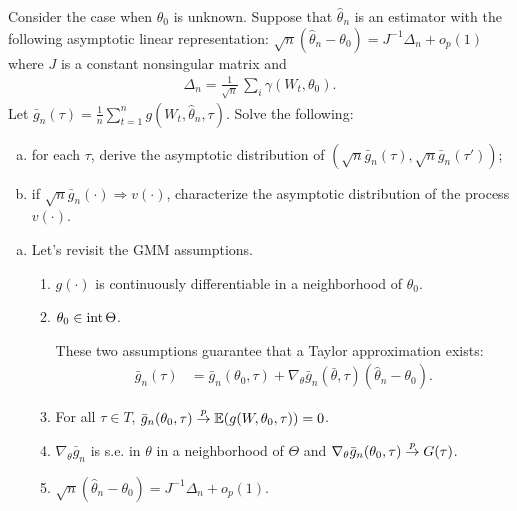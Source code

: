 \documentclass[11pt,letterpaper]{article}                  %
\begin{document}
\bigskip
\begin{problem}

\end{problem}

\bigskip
\begin{problem}
Consider the case when $\theta_0$ is unknown.
Suppose that $\hat{\theta}_n$ is an estimator with the following asymptotic linear representation:
$\sqrt{n} \left( \hat{\theta}_n - \theta_0 \right) = J^{-1} \Delta_n + o_p(1)$ where $J$ is a constant nonsingular matrix and
\begin{align*}
	\Delta_n = \frac{1}{\sqrt{n}} \, \sum_i \gamma (W_t, \theta_0).
\end{align*}
Let $\bar{g}_n (\tau) = \frac{1}{n} \sum_{t=1}^n g \left( W_t, \hat{\theta}_n, \tau \right)$.
Solve the following:
\begin{enumerate}[(a)]
	\item for each $\tau$, derive the asymptotic distribution of $(\sqrt{n} \bar{g}_n (\tau), \sqrt{n} \bar{g}_n (\tau'))$;
	\item if $\sqrt{n} \bar{g}_n (\cdot) \Rightarrow v(\cdot)$, characterize the asymptotic distribution of the process $v(\cdot)$.
\end{enumerate}

\medskip
\begin{enumerate}[(a)]
\item Let's revisit the GMM assumptions.

\begin{enumerate}[(1)]
	\item $g(\cdot)$ is continuously differentiable in a neighborhood of $\theta_0$.
	\item $\theta_0 \in {\rm int} \, \Theta$.

	These two assumptions guarantee that a Taylor approximation exists:
	\begin{align*}
		\bar{g}_n (\tau) &= \bar{g}_n (\theta_0, \tau) + \nabla_{\theta} \bar{g}_n (\bar{\theta}, \tau) (\hat{\theta}_n - \theta_0).
	\end{align*}

	\item For all $\tau \in T$, $\bar{g}_n (\theta_0, \tau) \overset{p}{\to} \mathbb{E} (g(W, \theta_0, \tau)) = 0$.
	\item $\nabla_{\theta} \bar{g}_n$ is s.e. in $\theta$ in a neighborhood of $\Theta$ and $\nabla_{\theta} \bar{g}_n (\theta_0, \tau) \overset{p}{\to} G(\tau)$.
	\item $\sqrt{n} \left( \hat{\theta}_n - \theta_0 \right) = J^{-1} \Delta_n + o_p(1)$.
\end{enumerate}


\end{enumerate}
\end{problem}
\end{document}
